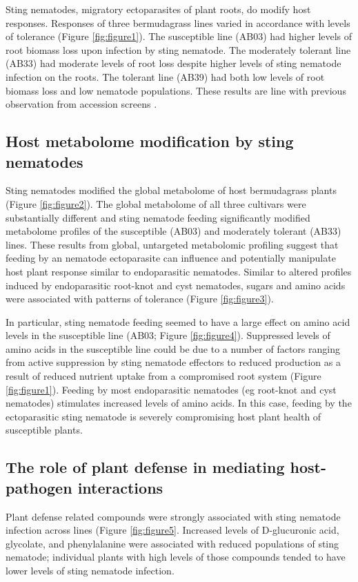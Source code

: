 \documentclass[9pt,lineno]{elife}
\begin{document}
Sting nematodes, migratory ectoparasites of plant roots, do modify host responses. Responses of three bermudagrass lines varied in accordance with levels of tolerance (Figure \ref{fig:figure1}).  The susceptible line (AB03) had higher levels of root biomass loss upon infection by sting nematode.  The moderately tolerant line (AB33) had moderate levels of root loss despite higher levels of sting nematode infection on the roots.  The tolerant line (AB39) had both low levels of root biomass loss and low nematode populations.  These results are line with previous observation from accession screens \citep{pang2011bermudagrass, pang2011screening}.

\subsection{Host metabolome modification by sting nematodes}
Sting nematodes modified the global metabolome of host bermudagrass plants (Figure \ref{fig:figure2}).  The global metabolome of all three cultivars were substantially different and sting nematode feeding significantly modified metabolome profiles of the susceptible (AB03) and moderately tolerant (AB33) lines.  These results from global, untargeted metabolomic profiling suggest that feeding by an nematode ectoparasite can influence and potentially manipulate host plant response similar to endoparasitic nematodes.  Similar to altered profiles induced by endoparasitic root-knot and cyst nematodes, sugars and amino acids were associated with patterns of tolerance (Figure \ref{fig:figure3}).  

In particular, sting nematode feeding seemed to have a large effect on amino acid levels in the susceptible line (AB03; Figure \ref{fig:figure4}). Suppressed levels of amino acids in the susceptible line could be due to a number of factors ranging from active suppression by sting nematode effectors to reduced production as a result of reduced nutrient uptake from a compromised root system (Figure \ref{fig:figure1}). Feeding by most endoparasitic nematodes (eg root-knot and cyst nematodes) stimulates increased levels of amino acids. In this case, feeding by the ectoparasitic sting nematode is severely compromising host plant health of susceptible plants. 
\subsection{The role of plant defense in mediating host-pathogen interactions}
Plant defense related compounds were strongly associated with sting nematode infection across lines (Figure \ref{fig:figure5}.  Increased levels of D-glucuronic acid, glycolate, and phenylalanine were associated with reduced populations of sting nematode; individual plants with high levels of those compounds tended to have lower levels of sting nematode infection.  
\end{document}
